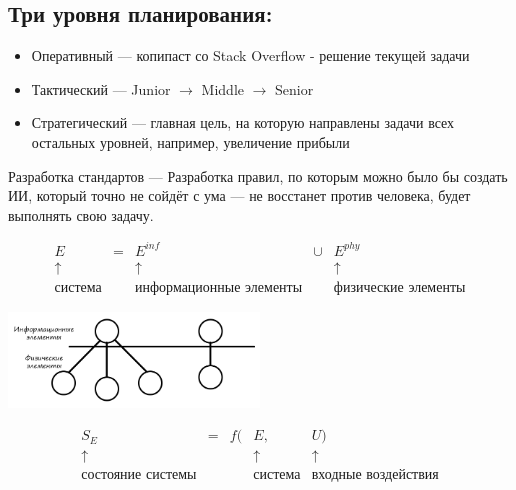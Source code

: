 \documentclass[12pt]{article}
\begin{document}
\begin{sloppypar}
    \subsection*{Три уровня планирования:}
    \begin{itemize}
        \item Оперативный — копипаст со Stack Overflow - решение текущей задачи
        \item Тактический — Junior $\rightarrow$ Middle $\rightarrow$ Senior
        \item Стратегический — главная цель, на которую направлены задачи всех
              остальных уровней, например, увеличение прибыли
    \end{itemize}

    Разработка стандартов — Разработка правил, по которым можно было бы создать
    ИИ, который точно не сойдёт с ума — не восстанет против человека, будет
    выполнять свою задачу.

    \[
        \begin{array}{ccccc}
            E              & = & E^{\textit{inf}}               & \cup & E^{phy}                    \\
            \uparrow       &   & \uparrow                       &      & \uparrow                   \\
            \text{система} &   & \text{информационные элементы} &      & \text{физические элементы}
        \end{array}
    \]
    \begin{center}
        \includegraphics[width=0.5\textwidth]{graphics/Информационные_и_физические_элементы.png}
    \end{center}
    \[
        \begin{array}{ccccc}
            S_E                      & = & f( & E,             & U)                         \\
            \uparrow                 &   &    & \uparrow       & \uparrow                   \\
            \text{состояние системы} &   &    & \text{система} & \text{входные воздействия}
        \end{array}
    \]


\end{sloppypar}
\end{document}
